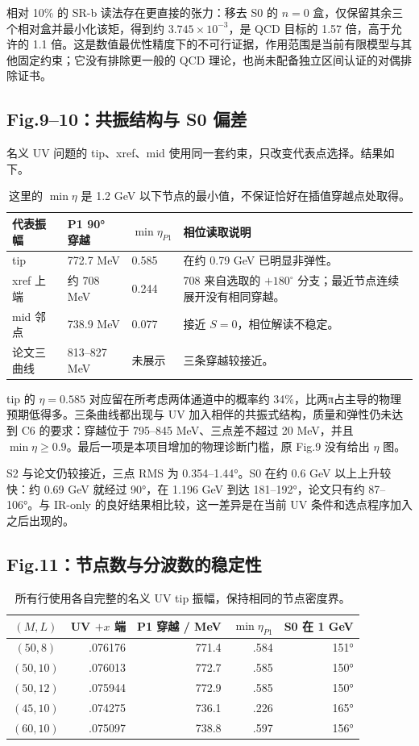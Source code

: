 \documentclass[UTF8,a4paper,11pt,fontset=fandol]{ctexart}
\numberwithin{equation}{section}
\begin{document}
相对 10\% 的 SR-b 读法存在更直接的张力：移去 S0 的 \(n=0\) 盒，仅保留其余三个相对盒并最小化该矩，得到约 \(3.745\times10^{-3}\)，是 QCD 目标的 1.57 倍，高于允许的 1.1 倍。这是数值最优性精度下的不可行证据，作用范围是当前有限模型与其他固定约束；它没有排除更一般的 QCD 理论，也尚未配备独立区间认证的对偶排除证书。

\subsection{Fig.9--10：共振结构与 S0 偏差}
名义 UV 问题的 tip、xref、mid 使用同一套约束，只改变代表点选择。结果如下。
\begin{table}[H]\centering\small
\begin{tabularx}{\linewidth}{P{25mm}P{32mm}P{30mm}Y}
\toprule
代表振幅 & P1 90° 穿越 & \(\min\eta_{P1}\) & 相位读取说明\\
\midrule
tip & 772.7 MeV & 0.585 & 在约 0.79 GeV 已明显非弹性。\\
xref 上端 & 约 708 MeV & 0.244 & 708 来自选取的 \(+180^\circ\) 分支；最近节点连续展开没有相同穿越。\\
mid 邻点 & 738.9 MeV & 0.077 & 接近 \(S=0\)，相位解读不稳定。\\
论文三曲线 & 813--827 MeV & 未展示 & 三条穿越较接近。\\
\bottomrule
\end{tabularx}
\caption{这里的 \(\min\eta\) 是 1.2 GeV 以下节点的最小值，不保证恰好在插值穿越点处取得。}
\end{table}

tip 的 \(\eta=0.585\) 对应留在所考虑两体通道中的概率约 34\%，比两π占主导的物理预期低得多。三条曲线都出现与 UV 加入相伴的共振式结构，质量和弹性仍未达到 C6 的要求：穿越位于 795--845 MeV、三点差不超过 20 MeV，并且 \(\min\eta\ge0.9\)。最后一项是本项目增加的物理诊断门槛，原 Fig.9 没有给出 \(\eta\) 图。

S2 与论文仍较接近，三点 RMS 为 0.354--1.44°。S0 在约 0.6 GeV 以上上升较快：约 0.69 GeV 就经过 90°，在 1.196 GeV 到达 181--192°，论文只有约 87--106°。与 IR-only 的良好结果相比较，这一差异是在当前 UV 条件和选点程序加入之后出现的。

\subsection{Fig.11：节点数与分波数的稳定性}
\begin{table}[H]\centering\small
\begin{tabular}{crrrr}
\toprule
\((M,L)\) & UV \(+x\) 端 & P1 穿越 / MeV & \(\min\eta_{P1}\) & S0 在 1 GeV\\
\midrule
\((50,8)\) & .076176 & 771.4 & .584 & 151°\\
\((50,10)\) & .076013 & 772.7 & .585 & 150°\\
\((50,12)\) & .075944 & 772.9 & .585 & 150°\\
\((45,10)\) & .074275 & 736.1 & .226 & 165°\\
\((60,10)\) & .075097 & 738.8 & .597 & 156°\\
\bottomrule
\end{tabular}
\caption{所有行使用各自完整的名义 UV tip 振幅，保持相同的节点密度界。}
\end{table}
\end{document}
